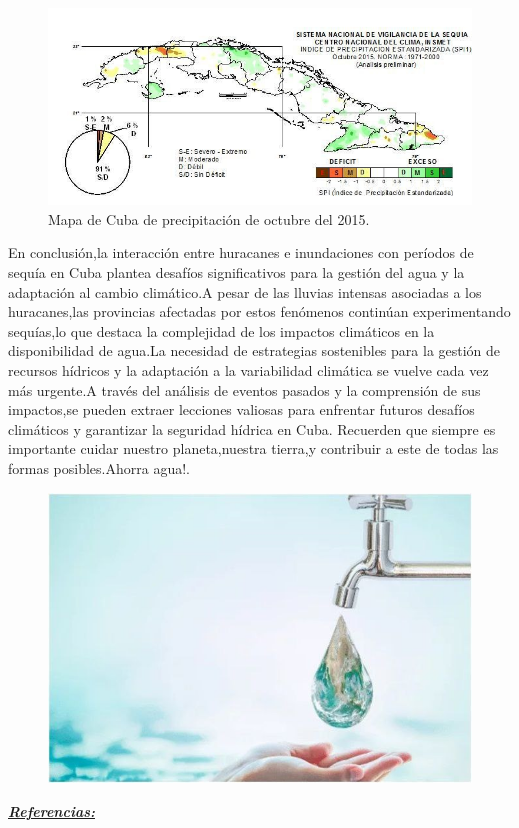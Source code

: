 \documentclass[12pt]{article}
\begin{document}
\begin{figure}[H]
	\centering
	\includegraphics[width=0.7\linewidth]{./Informe/images/mapa_octubre_2015}
	\caption{Mapa de Cuba de precipitación de octubre del 2015.}
	\label{fig:mapaoctubre2015}
\end{figure}



En conclusión,la interacción entre huracanes e inundaciones con períodos de sequía en Cuba plantea desafíos significativos para la gestión del agua y la adaptación al cambio climático.A pesar de las lluvias intensas asociadas a los huracanes,las provincias afectadas por estos fenómenos continúan experimentando sequías,lo que destaca la complejidad de los impactos climáticos en la disponibilidad de agua.La necesidad de estrategias sostenibles para la gestión de recursos hídricos y la adaptación a la variabilidad climática se vuelve cada vez más urgente.A través del análisis de eventos pasados y la comprensión de sus impactos,se pueden extraer lecciones valiosas para enfrentar futuros desafíos climáticos y garantizar la seguridad hídrica en Cuba. Recuerden que siempre es importante cuidar nuestro planeta,nuestra tierra,y contribuir a este de todas las formas posibles.Ahorra agua!.


\begin{figure}[H]
	\centering
	\includegraphics[width=0.4\linewidth]{./Informe/images/agua}
	\label{fig:agua}
\end{figure}

\newpage

\begin{center}
	\textbf{\textit{\underline{{\fontsize{50}{24}\selectfont Referencias:}
}}}
\end{center}
\end{document}
